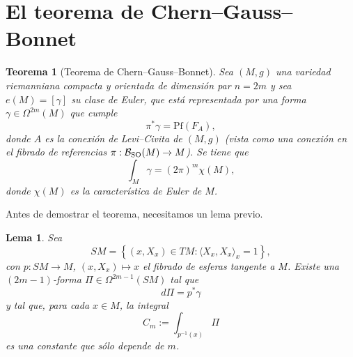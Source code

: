 \documentclass[11pt,a4paper]{amsbook}
\newtheorem{thm}[subsection]{Teorema}
\newtheorem{lemma}[subsection]{Lema}
\theoremstyle{remark} \newtheorem{rmk}[subsection]{Observación}
\theoremstyle{definition} \newtheorem{defn}[subsection]{Definición}
\theoremstyle{definition} \newtheorem{ex}[subsection]{Ejemplo}
\theoremstyle{definition} \newtheorem{ej}[subsection]{Ejercicio}
\begin{document}
\section{El teorema de Chern--Gauss--Bonnet}
\begin{thm}[Teorema de Chern--Gauss--Bonnet]
  Sea $(M,g)$ una variedad riemanniana compacta y orientada de dimensión par $n=2m$ y sea $e(M)=[\gamma]$ su clase de Euler, que está representada por una forma $\gamma \in \Omega^{2m}(M)$ que cumple
\begin{equation*}
\pi^* \gamma= \mathrm{Pf}(F_A),
\end{equation*}
donde $A$ es la conexión de Levi--Civita de $(M,g)$ (vista como una conexión en el fibrado de referencias $\pi: \mathcal{B}_{\operatorname{SO}}(M)\rightarrow M$).
  Se tiene que
  \begin{equation*}
\int_{M} \gamma = (2\pi)^m \chi(M),
  \end{equation*}
donde $\chi(M)$ es la característica de Euler de $M$.
\end{thm}

Antes de demostrar el teorema, necesitamos un lema previo.

\begin{lemma}
  Sea
  \begin{equation*}
SM = \left\{ (x,X_x) \in TM : \langle X_x,X_x \rangle_x = 1 \right\},
  \end{equation*}
  con $p:SM\rightarrow M$, $(x,X_x)\mapsto x$ el \emph{fibrado de esferas tangente} a $M$. Existe una $(2m-1)$-forma $\Pi \in \Omega^{2m-1}(SM)$ tal que \[d\Pi = p^* \gamma\] y tal que, para cada $x\in M$, la integral \[C_m:=\int_{p^{-1}(x)} \Pi\]
  es una constante que sólo depende de $m$.
\end{lemma}
\end{document}
